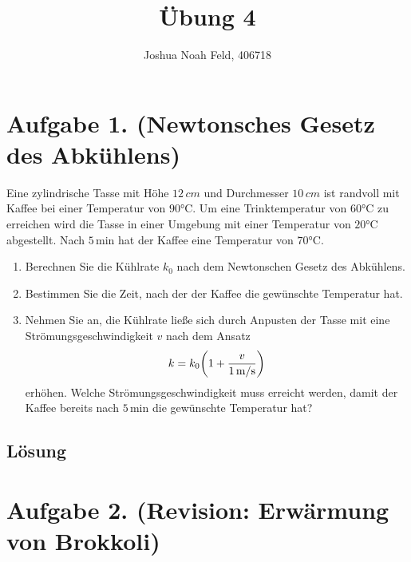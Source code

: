 \documentclass[german,12pt]{homework}
\title{Übung 4}
\author{Joshua Noah Feld, 406718}
\institute{RWTH Aachen University\\Aachener Verfahrenstechnik}
\DeclarePairedDelimiter{\enbrace}{(}{)}
\begin{document}
    \maketitle

    \section*{Aufgabe 1. (Newtonsches Gesetz des Abkühlens)}

    \begin{problem}
        Eine zylindrische Tasse mit Höhe \(12\,\si{cm}\) und Durchmesser \(10\,\si{cm}\) ist randvoll mit Kaffee bei einer Temperatur von \(90\si{\degreeCelsius}\). Um eine Trinktemperatur von \(60\si{\degreeCelsius}\) zu erreichen wird die Tasse in einer Umgebung mit einer Temperatur von \(20\si{\degreeCelsius}\) abgestellt. Nach \(5\,\si{\minute}\) hat der Kaffee eine Temperatur von \(70\si{\degreeCelsius}\).
        \begin{enumerate}
            \item Berechnen Sie die Kühlrate \(k_0\) nach dem Newtonschen Gesetz des Abkühlens.
            \item Bestimmen Sie die Zeit, nach der der Kaffee die gewünschte Temperatur hat.
            \item Nehmen Sie an, die Kühlrate ließe sich durch Anpusten der Tasse mit eine Strömungsgeschwindigkeit \(v\) nach dem Ansatz
            \[k = k_0\enbrace*{1 + \frac{v}{1\,\si{\metre\per{\second}}}}\]
            erhöhen. Welche Strömungsgeschwindigkeit muss erreicht werden, damit der Kaffee bereits nach \(5\,\si{\minute}\) die gewünschte Temperatur hat?
        \end{enumerate}
    \end{problem}

    \subsection*{Lösung}

    \section*{Aufgabe 2. (Revision: Erwärmung von Brokkoli)}
\end{document}
